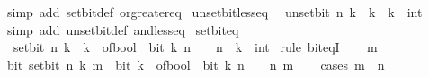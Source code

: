 \begin{isabellebody}
\isamarkupfalse%
\ {\isacharparenleft}{\kern0pt}simp\ add{\isacharcolon}{\kern0pt}\ set{\isacharunderscore}{\kern0pt}bit{\isacharunderscore}{\kern0pt}def\ or{\isacharunderscore}{\kern0pt}greater{\isacharunderscore}{\kern0pt}eq{\isacharparenright}{\kern0pt}%
\endisatagproof
{\isafoldproof}%
%
\isadelimproof
\isanewline
%
\endisadelimproof
\isanewline
{}\isamarkupfalse%
\ unset{\isacharunderscore}{\kern0pt}bit{\isacharunderscore}{\kern0pt}less{\isacharunderscore}{\kern0pt}eq{\isacharcolon}{\kern0pt}\isanewline
\ \ {\isacartoucheopen}unset{\isacharunderscore}{\kern0pt}bit\ n\ k\ {\isasymle}\ k{\isacartoucheclose}\ \ k\ {\isacharcolon}{\kern0pt}{\isacharcolon}{\kern0pt}\ int\isanewline
%
\isadelimproof
\ \ %
\endisadelimproof
%
\isatagproof
{}\isamarkupfalse%
\ {\isacharparenleft}{\kern0pt}simp\ add{\isacharcolon}{\kern0pt}\ unset{\isacharunderscore}{\kern0pt}bit{\isacharunderscore}{\kern0pt}def\ and{\isacharunderscore}{\kern0pt}less{\isacharunderscore}{\kern0pt}eq{\isacharparenright}{\kern0pt}%
\endisatagproof
{\isafoldproof}%
%
\isadelimproof
\isanewline
%
\endisadelimproof
\isanewline
{}\isamarkupfalse%
\ set{\isacharunderscore}{\kern0pt}bit{\isacharunderscore}{\kern0pt}eq{\isacharcolon}{\kern0pt}\isanewline
\ \ {\isacartoucheopen}set{\isacharunderscore}{\kern0pt}bit\ n\ k\ {\isacharequal}{\kern0pt}\ k\ {\isacharplus}{\kern0pt}\ of{\isacharunderscore}{\kern0pt}bool\ {\isacharparenleft}{\kern0pt}{\isasymnot}\ bit\ k\ n{\isacharparenright}{\kern0pt}\ {\isacharasterisk}{\kern0pt}\ {}\ {\isacharcircum}{\kern0pt}\ n{\isacartoucheclose}\ \ k\ {\isacharcolon}{\kern0pt}{\isacharcolon}{\kern0pt}\ int\isanewline
%
\isadelimproof
%
\endisadelimproof
%
\isatagproof
{}\isamarkupfalse%
\ {\isacharparenleft}{\kern0pt}rule\ bit{\isacharunderscore}{\kern0pt}eqI{\isacharparenright}{\kern0pt}\isanewline
\ \ \isamarkupfalse%
\ m\isanewline
\ \ \isamarkupfalse%
\ {\isacartoucheopen}bit\ {\isacharparenleft}{\kern0pt}set{\isacharunderscore}{\kern0pt}bit\ n\ k{\isacharparenright}{\kern0pt}\ m\ {\isasymlongleftrightarrow}\ bit\ {\isacharparenleft}{\kern0pt}k\ {\isacharplus}{\kern0pt}\ of{\isacharunderscore}{\kern0pt}bool\ {\isacharparenleft}{\kern0pt}{\isasymnot}\ bit\ k\ n{\isacharparenright}{\kern0pt}\ {\isacharasterisk}{\kern0pt}\ {}\ {\isacharcircum}{\kern0pt}\ n{\isacharparenright}{\kern0pt}\ m{\isacartoucheclose}\isanewline
\ \ \isamarkupfalse%
\ {\isacharparenleft}{\kern0pt}cases\ {\isacartoucheopen}m\ {\isacharequal}{\kern0pt}\ n{\isacartoucheclose}{\isacharparenright}{\kern0pt}\isanewline

\end{isabellebody}
